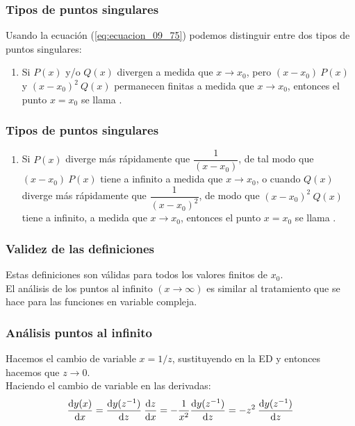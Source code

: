 \documentclass[12pt]{beamer}
\begin{document}
\begin{frame}
\frametitle{Tipos de puntos singulares}
Usando la ecuación (\ref{eq:ecuacion_09_75}) podemos distinguir entre dos tipos de puntos singulares:
\pause
{}
\begin{enumerate}[<+->]
\item Si $P (x)$ y/o $Q (x)$ divergen a medida que $x \to x_{0}$, pero $(x - x_{0}) \: P (x)$ y $(x - x_{0})^{2} \: Q (x)$ permanecen finitas a medida que $x \to x_{0}$, entonces el punto $x = x_{0}$ se llama .
\seti
\end{enumerate}
\end{frame}
\begin{frame}
\frametitle{Tipos de puntos singulares}
\begin{enumerate}[<+->]
\conti 
\item Si $P (x)$ diverge más rápidamente que $\dfrac{1}{(x - x_{0})}$, de tal modo que $(x - x_{0}) \: P (x)$ tiene a infinito a medida que $x \to x_{0}$, o cuando $Q (x)$ diverge más rápidamente que $\dfrac{1}{(x - x_{0})^{2}}$, de modo que $(x - x_{0})^{2} \: Q (x)$ tiene a infinito, a medida que $x \to x_{0}$, entonces el punto $x = x_{0}$ se llama .
\end{enumerate}
\end{frame}
\begin{frame}
\frametitle{Validez de las definiciones}
Estas definiciones son válidas para todos los valores finitos de $x_{0}$. 
\\
\bigskip
\pause
El análisis de los puntos al infinito $(x \to \infty)$ es similar al tratamiento que se hace para las funciones en variable compleja.
\end{frame}
\begin{frame}
\frametitle{Análisis puntos al infinito}
Hacemos el cambio de variable $x = 1/z$, sustituyendo en la ED y entonces hacemos que $z \to 0$. 
\\
\bigskip
\pause
Haciendo el cambio de variable en las derivadas:
\begin{align}
\dv{y(x)}{x} = \dv{y(z^{-1})}{z} \: \dv{z}{x} = - \dfrac{1}{x^{2}} \dv{y(z^{-1})}{z} = -z^{2} \: \dv{y(z^{-1})}{z}
\label{eq:ecuacion_09_76}
\end{align}
\end{frame}
\end{document}
